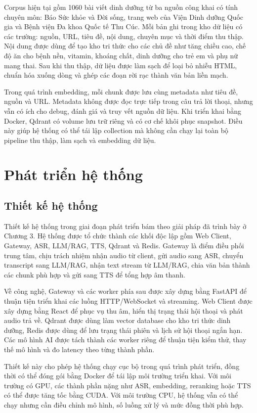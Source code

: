 \documentclass[a4paper,13pt,oneside]{report}
\begin{document}
Corpus hiện tại gồm 1060 bài viết dinh dưỡng từ ba nguồn công khai có tính chuyên môn: Báo Sức khỏe và Đời sống, trang web của Viện Dinh dưỡng Quốc gia và Bệnh viện Đa khoa Quốc tế Thu Cúc. Mỗi bản ghi trong kho dữ liệu có các trường: nguồn, URL, tiêu đề, nội dung, chuyên mục và thời điểm thu thập. Nội dung được dùng để tạo kho tri thức cho các chủ đề như tăng chiều cao, chế độ ăn cho bệnh nền, vitamin, khoáng chất, dinh dưỡng cho trẻ em và phụ nữ mang thai. Sau khi thu thập, dữ liệu được làm sạch để loại bỏ nhiễu HTML, chuẩn hóa xuống dòng và ghép các đoạn rời rạc thành văn bản liền mạch.

Trong quá trình embedding, mỗi chunk được lưu cùng metadata như tiêu đề, nguồn và URL. Metadata không được đọc trực tiếp trong câu trả lời thoại, nhưng vẫn có ích cho debug, đánh giá và truy vết nguồn dữ liệu. Khi triển khai bằng Docker, Qdrant có volume lưu trữ riêng và có cơ chế khôi phục snapshot. Điều này giúp hệ thống có thể tái lập collection mà không cần chạy lại toàn bộ pipeline thu thập, làm sạch và embedding dữ liệu.

\section{Phát triển hệ thống}

\subsection{Thiết kế hệ thống}

Thiết kế hệ thống trong giai đoạn phát triển bám theo giải pháp đã trình bày ở Chương 3. Hệ thống được tổ chức thành các khối độc lập gồm Web Client, Gateway, ASR, LLM/RAG, TTS, Qdrant và Redis. Gateway là điểm điều phối trung tâm, chịu trách nhiệm nhận audio từ client, gửi audio sang ASR, chuyển transcript sang LLM/RAG, nhận text stream từ LLM/RAG, chia văn bản thành các chunk phù hợp và gửi sang TTS để tổng hợp âm thanh.

Về công nghệ, Gateway và các worker phía sau được xây dựng bằng FastAPI để thuận tiện triển khai các luồng HTTP/WebSocket và streaming. Web Client được xây dựng bằng React để phục vụ thu âm, hiển thị trạng thái hội thoại và phát audio trả về. Qdrant được dùng làm vector database cho kho tri thức dinh dưỡng, Redis được dùng để lưu trạng thái phiên và lịch sử hội thoại ngắn hạn. Các mô hình AI được tách thành các worker riêng để thuận tiện kiểm thử, thay thế mô hình và đo latency theo từng thành phần.

Thiết kế này cho phép hệ thống chạy cục bộ trong quá trình phát triển, đồng thời có thể đóng gói bằng Docker để tái lập môi trường triển khai. Với môi trường có GPU, các thành phần nặng như ASR, embedding, reranking hoặc TTS có thể được tăng tốc bằng CUDA. Với môi trường CPU, hệ thống vẫn có thể chạy nhưng cần điều chỉnh mô hình, số luồng xử lý và mức đồng thời phù hợp.
\end{document}
